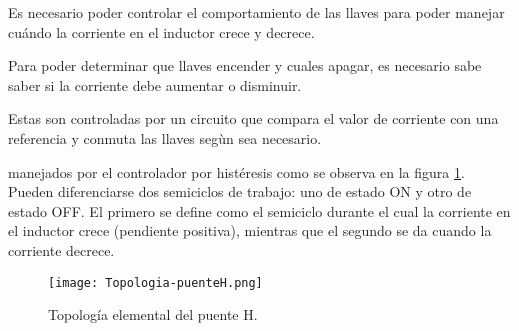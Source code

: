 Es necesario poder controlar el comportamiento de las llaves para poder manejar cuándo la corriente en el inductor crece y decrece. 

Para poder determinar que llaves encender y cuales apagar, es necesario sabe saber si la corriente debe aumentar o disminuir.

Estas son controladas por un circuito que compara el valor de corriente con una referencia y conmuta las llaves segùn sea necesario.

 manejados por el controlador por histéresis como se observa en la figura \ref{fig:img_topologia-puenteH}. Pueden diferenciarse dos semiciclos de trabajo: uno de estado ON y otro de estado OFF. El primero se define como el semiciclo durante el cual la corriente en el inductor crece (pendiente positiva), mientras que el segundo se da cuando la corriente decrece.

\begin{figure}[H]
	\centering
	\texttt{[image: Topologia-puenteH.png]}
	\caption{Topología elemental del puente H.}
	\label{fig:img_topologia-puenteH}
\end{figure}

